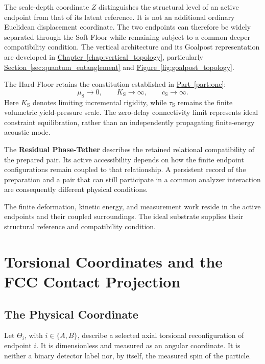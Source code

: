 The scale-depth coordinate $Z$ distinguishes the structural level of an active endpoint from that of its latent reference. It is not an additional ordinary Euclidean displacement coordinate. The two endpoints can therefore be widely separated through the Soft Floor while remaining subject to a common deeper compatibility condition. The vertical architecture and its Goalpost representation are developed in \hyperref[chap:vertical_topology]{Chapter~\ref*{chap:vertical_topology}}, particularly \hyperref[sec:quantum_entanglement]{Section~\ref*{sec:quantum_entanglement}} and \hyperref[fig:goalpost_topology]{Figure~\ref*{fig:goalpost_topology}}.

The Hard Floor retains the constitution established in \hyperref[part:one]{Part~\ref*{part:one}}:
\begin{equation}
    \boxed{
    \mu_{\mathrm S}\rightarrow0,
    \qquad
    K_{\mathrm S}\rightarrow\infty,
    \qquad
    c_{\mathrm S}\rightarrow\infty
    }.
\end{equation}
Here $K_{\mathrm S}$ denotes limiting incremental rigidity, while $\tau_{\mathrm S}$ remains the finite volumetric yield-pressure scale. The zero-delay connectivity limit represents ideal constraint equilibration, rather than an independently propagating finite-energy acoustic mode.

The \textbf{Residual Phase-Tether} describes the retained relational compatibility of the prepared pair. Its active accessibility depends on how the finite endpoint configurations remain coupled to that relationship. A persistent record of the preparation and a pair that can still participate in a common analyzer interaction are consequently different physical conditions.

The finite deformation, kinetic energy, and measurement work reside in the active endpoints and their coupled surroundings. The ideal substrate supplies their structural reference and compatibility condition.

\section{Torsional Coordinates and the FCC Contact Projection}

\subsection{The Physical Coordinate}

Let $\Theta_i$, with $i\in\{A,B\}$, describe a selected axial torsional reconfiguration of endpoint $i$. It is dimensionless and measured as an angular coordinate. It is neither a binary detector label nor, by itself, the measured spin of the particle.

